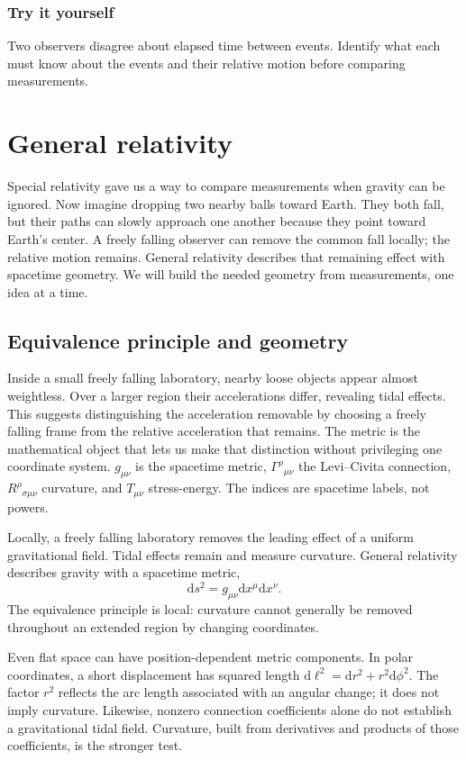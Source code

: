 \documentclass[11pt,oneside]{book}
\newcommand{\dd}{\mathrm{d}}
\theoremstyle{reviewstyle}
\newcommand{\learningcheck}[1]{\subsection*{Try it yourself}\noindent #1\par}
\begin{document}
\learningcheck{Two observers disagree about elapsed time between events. Identify what each must know about the events and their relative motion before comparing measurements.}

\chapter{General relativity}
Special relativity gave us a way to compare measurements when gravity can be ignored. Now imagine dropping two nearby balls toward Earth. They both fall, but their paths can slowly approach one another because they point toward Earth's center. A freely falling observer can remove the common fall locally; the relative motion remains. General relativity describes that remaining effect with spacetime geometry. We will build the needed geometry from measurements, one idea at a time.

\section{Equivalence principle and geometry}
Inside a small freely falling laboratory, nearby loose objects appear almost weightless. Over a larger region their accelerations differ, revealing tidal effects. This suggests distinguishing the acceleration removable by choosing a freely falling frame from the relative acceleration that remains. The metric is the mathematical object that lets us make that distinction without privileging one coordinate system. $g_{\mu\nu}$ is the spacetime metric, $\Gamma^\rho{}_{\mu\nu}$ the Levi--Civita connection, $R^\rho{}_{\sigma\mu\nu}$ curvature, and $T_{\mu\nu}$ stress-energy. The indices are spacetime labels, not powers.

Locally, a freely falling laboratory removes the leading effect of a uniform gravitational field. Tidal effects remain and measure curvature. General relativity describes gravity with a spacetime metric,
\begin{equation}\dd s^2=g_{\mu\nu}\dd x^\mu\dd x^\nu.\end{equation}
The equivalence principle is local: curvature cannot generally be removed throughout an extended region by changing coordinates.

Even flat space can have position-dependent metric components. In polar coordinates, a short displacement has squared length $\dd\ell^2=\dd r^2+r^2\dd\phi^2$. The factor $r^2$ reflects the arc length associated with an angular change; it does not imply curvature. Likewise, nonzero connection coefficients alone do not establish a gravitational tidal field. Curvature, built from derivatives and products of those coefficients, is the stronger test.
\end{document}
